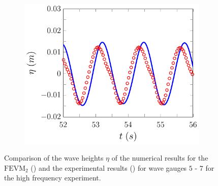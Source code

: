\begin{figure}
	\begin{subfigure}{0.5\textwidth}
		\includegraphics[width=\textwidth]{./chp6/figures/Experiment/Beji/sh/FEVMWG7.pdf}
		\vspace{0.5cm}
	\end{subfigure}
	\caption{Comparison of the wave heights $\eta$ of the numerical results for the $\text{FEVM}_2$ ({\color{blue}\solidrule}) and the experimental results () for wave gauges $5$ - $7$ for the high frequency experiment.}
	\label{fig:BejishWG5to7FEVM}
\end{figure}


